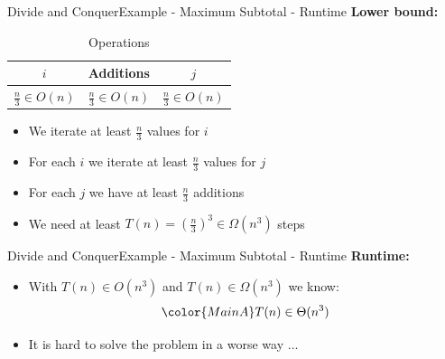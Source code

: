 \begin{frame}{Divide and Conquer}{Example - Maximum Subtotal - Runtime}
  \textbf{Lower bound:}
  \begin{table}
    \caption{Operations}
    \label{fig:divide_and_conquer:max_sub_total_operations}
    \begin{tabular}{c|c|c}
      $i$ & Additions & $j$\\
      \midrule
      $\frac{n}{3} \in O(n)$ &
      $\frac{n}{3} \in O(n)$ &
      $\frac{n}{3} \in O(n)$\\
    \end{tabular}
  \end{table}
  \begin{itemize}
    \item<2->
      We iterate at least {\color{MainA}$\frac{n}{3}$} values for {\color{MainA}$i$}
    \item<3->
      For each {\color{MainA}$i$} we iterate at least {\color{MainA}$\frac{n}{3}$} values for {\color{MainA}$j$}
    \item<4->
      For each {\color{MainA}$j$} we have at least {\color{MainA}$\frac{n}{3}$} additions
    \item<5->
      We need at least {\color{MainA}$T(n) = (\frac{n}{3})^3 \in \Omega(n^3)$} steps
  \end{itemize}
  
\end{frame}


\begin{frame}{Divide and Conquer}{Example - Maximum Subtotal - Runtime}
  \textbf{Runtime:}
  \begin{itemize}
    \item<2->
      With {\color{MainA}$T(n) \in O(n^3)$} and
      {\color{MainA}$T(n) \in \Omega(n^3)$} we know:
      \begin{displaymath}
        \color{MainA}
        T(n) \in \Theta(n^3)
      \end{displaymath}
    \item<3->
      It is hard to solve the problem in a worse way $\ldots$
  \end{itemize}
\end{frame}


